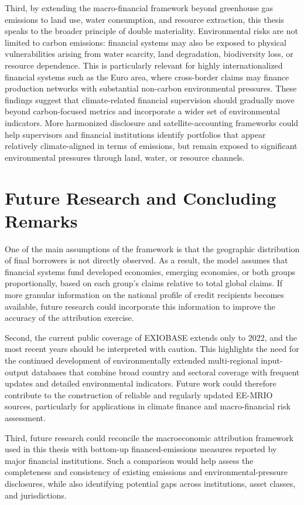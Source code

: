 Third, by extending the macro-financial framework beyond greenhouse gas emissions to land use, water consumption, and resource extraction, this thesis speaks to the broader principle of double materiality. Environmental risks are not limited to carbon emissions: financial systems may also be exposed to physical vulnerabilities arising from water scarcity, land degradation, biodiversity loss, or resource dependence. This is particularly relevant for highly internationalized financial systems such as the Euro area, where cross-border claims may finance production networks with substantial non-carbon environmental pressures. These findings suggest that climate-related financial supervision should gradually move beyond carbon-focused metrics and incorporate a wider set of environmental indicators. More harmonized disclosure and satellite-accounting frameworks could help supervisors and financial institutions identify portfolios that appear relatively climate-aligned in terms of emissions, but remain exposed to significant environmental pressures through land, water, or resource channels.

\section{Future Research and Concluding Remarks}

One of the main assumptions of the framework is that the geographic distribution of final borrowers is not directly observed. As a result, the model assumes that financial systems fund developed economies, emerging economies, or both groups proportionally, based on each group’s claims relative to total global claims. If more granular information on the national profile of credit recipients becomes available, future research could incorporate this information to improve the accuracy of the attribution exercise.

Second, the current public coverage of EXIOBASE extends only to 2022, and the most recent years should be interpreted with caution. This highlights the need for the continued development of environmentally extended multi-regional input-output databases that combine broad country and sectoral coverage with frequent updates and detailed environmental indicators. Future work could therefore contribute to the construction of reliable and regularly updated EE-MRIO sources, particularly for applications in climate finance and macro-financial risk assessment.

Third, future research could reconcile the macroeconomic attribution framework used in this thesis with bottom-up financed-emissions measures reported by major financial institutions. Such a comparison would help assess the completeness and consistency of existing emissions and environmental-pressure disclosures, while also identifying potential gaps across institutions, asset classes, and jurisdictions.

